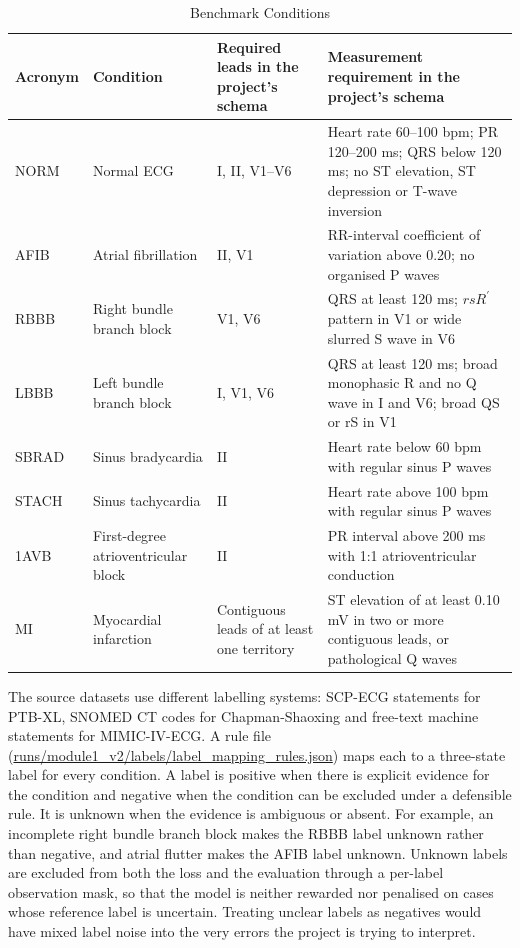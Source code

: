 \begin{table}[htbp]
\centering
\scriptsize
\caption{Benchmark Conditions}
\label{tab:benchmark_conditions}
\renewcommand{\arraystretch}{1.2}
\setlength{\tabcolsep}{3pt}
\begin{tabular}{|p{1.3cm}|p{2.4cm}|p{3.1cm}|p{6.9cm}|}
\hline
\textbf{Acronym} & \textbf{Condition} & \textbf{Required leads in the project's schema} & \textbf{Measurement requirement in the project's schema} \\ \hline
NORM & Normal ECG & I, II, V1--V6 & Heart rate 60--100 bpm; PR 120--200 ms; QRS below 120 ms; no ST elevation, ST depression or T-wave inversion \\ \hline
AFIB & Atrial fibrillation & II, V1 & RR-interval coefficient of variation above 0.20; no organised P waves \\ \hline
RBBB & Right bundle branch block & V1, V6 & QRS at least 120 ms; $rsR^\prime$ pattern in V1 or wide slurred S wave in V6 \\ \hline
LBBB & Left bundle branch block & I, V1, V6 & QRS at least 120 ms; broad monophasic R and no Q wave in I and V6; broad QS or rS in V1 \\ \hline
SBRAD & Sinus bradycardia & II & Heart rate below 60 bpm with regular sinus P waves \\ \hline
STACH & Sinus tachycardia & II & Heart rate above 100 bpm with regular sinus P waves \\ \hline
1AVB & First-degree atrioventricular block & II & PR interval above 200 ms with 1:1 atrioventricular conduction \\ \hline
MI & Myocardial infarction & Contiguous leads of at least one territory & ST elevation of at least 0.10 mV in two or more contiguous leads, or pathological Q waves \\ \hline
\end{tabular}
\end{table}

The source datasets use different labelling systems: SCP-ECG statements for PTB-XL, SNOMED CT codes for Chapman-Shaoxing and free-text machine statements for MIMIC-IV-ECG. A rule file (\url{runs/module1_v2/labels/label_mapping_rules.json}) maps each to a three-state label for every condition. A label is positive when there is explicit evidence for the condition and negative when the condition can be excluded under a defensible rule. It is unknown when the evidence is ambiguous or absent. For example, an incomplete right bundle branch block makes the RBBB label unknown rather than negative, and atrial flutter makes the AFIB label unknown. Unknown labels are excluded from both the loss and the evaluation through a per-label observation mask, so that the model is neither rewarded nor penalised on cases whose reference label is uncertain. Treating unclear labels as negatives would have mixed label noise into the very errors the project is trying to interpret.

